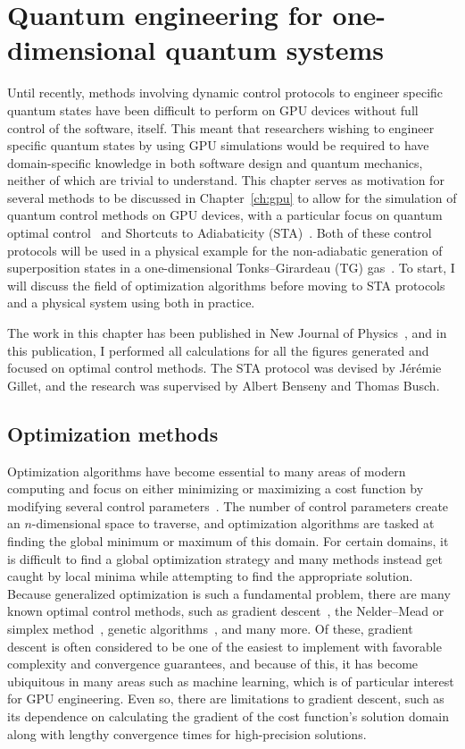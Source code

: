 \chapter{Quantum engineering for one-dimensional quantum systems}
\label{ch:1d}

Until recently, methods involving dynamic control protocols to engineer specific quantum states have been difficult to perform on GPU devices without full control of the software, itself.
This meant that researchers wishing to engineer specific quantum states by using GPU simulations would be required to have domain-specific knowledge in both software design and quantum mechanics, neither of which are trivial to understand.
This chapter serves as motivation for several methods to be discussed in Chapter~\ref{ch:gpu} to allow for the simulation of quantum control methods on GPU devices, with a particular focus on quantum optimal control~\cite{werschnik2007} and Shortcuts to Adiabaticity (STA)~\cite{guery2019}.
Both of these control protocols will be used in a physical example for the non-adiabatic generation of superposition states in a one-dimensional Tonks--Girardeau (TG) gas~\cite{schloss2016}.
To start, I will discuss the field of optimization algorithms before moving to STA protocols and a physical system using both in practice.

The work in this chapter has been published in New Journal of Physics~\cite{schloss2016}, and in this publication, I performed all calculations for all the figures generated and focused on optimal control methods.
The STA protocol was devised by J\'er\'emie Gillet, and the research was supervised by Albert Benseny and Thomas Busch.

\section{Optimization methods}

Optimization algorithms have become essential to many areas of modern computing and focus on either minimizing or maximizing a cost function by modifying several control parameters~\cite{lewis2012}.
The number of control parameters create an $n$-dimensional space to traverse, and optimization algorithms are tasked at finding the global minimum or maximum of this domain.
For certain domains, it is difficult to find a global optimization strategy and many methods instead get caught by local minima while attempting to find the appropriate solution.
Because generalized optimization is such a fundamental problem, there are many known optimal control methods, such as gradient descent~\cite{ruder2016}, the Nelder--Mead or simplex method~\cite{nelder1965}, genetic algorithms~\cite{koza1997}, and many more.
Of these, gradient descent is often considered to be one of the easiest to implement with favorable complexity and convergence guarantees, and because of this, it has become ubiquitous in many areas such as machine learning, which is of particular interest for GPU engineering. 
Even so, there are limitations to gradient descent, such as its dependence on calculating the gradient of the cost function's solution domain along with lengthy convergence times for high-precision solutions.

